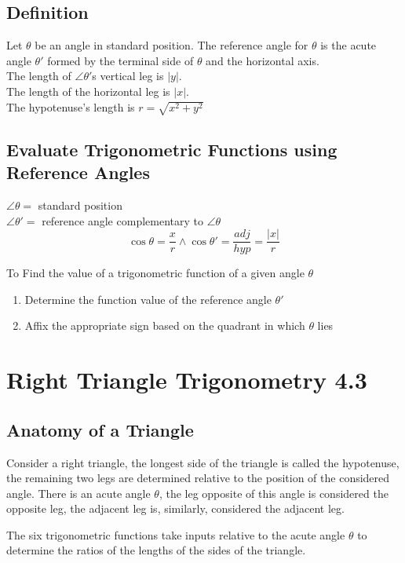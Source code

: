 \documentclass{article}
\begin{document}
\subsection{Definition}
Let $\theta$ be an angle in standard position. The reference angle for
$\theta$ is the acute angle $\theta'$ formed by the terminal side of $\theta$
and the horizontal axis.\\ 
The length of $\angle\theta'$s vertical leg is $|y|$.\\
The length of the
horizontal leg is $|x|$.\\
The hypotenuse's length is $r =\sqrt{x^2+y^2}$

\subsection{Evaluate Trigonometric Functions using Reference Angles}
$\angle\theta =$ standard position\\
$\angle\theta'=$ reference angle complementary to $\angle\theta$
\[\cos \theta = \frac{x}{r} \land
\cos\theta'=\frac{adj}{hyp}=\frac{|x|}{r}\]

To Find the value of a trigonometric function of a given angle $\theta$
\begin{enumerate}
  \item Determine the function value of the reference angle $\theta'$

  \item 
    Affix the appropriate sign based on the quadrant in which $\theta$ lies
\end{enumerate}

\section{Right Triangle Trigonometry 4.3}
\subsection{Anatomy of a Triangle}
Consider a right triangle, the longest side of the triangle is called the
hypotenuse, the remaining two legs are determined relative to the position of
the considered angle. There is an acute angle $\theta$, the leg opposite of this
angle is considered the opposite leg, the adjacent leg is, similarly, considered
the adjacent leg. 

The six trigonometric functions take inputs relative to the acute angle $\theta$
to determine the ratios of the lengths of the sides of the triangle.
\end{document}

